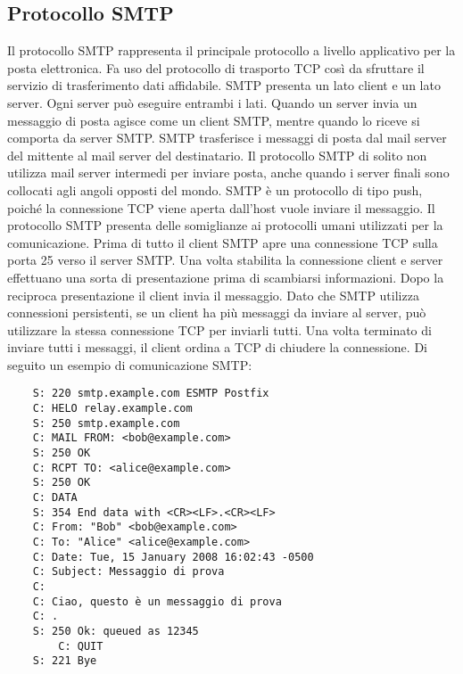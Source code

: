 \subsection{Protocollo SMTP}
Il protocollo SMTP rappresenta il principale protocollo a livello applicativo per la posta elettronica. 
Fa uso del protocollo di trasporto TCP così da sfruttare il servizio di trasferimento dati affidabile. 
SMTP presenta un lato client e un lato server. Ogni server può eseguire entrambi i lati. 
Quando un server invia un messaggio di posta agisce come un client SMTP, mentre quando lo riceve si comporta 
da server SMTP.
SMTP trasferisce i messaggi di posta dal mail server del mittente al mail server del destinatario. 
Il protocollo SMTP di solito non utilizza mail server intermedi per inviare posta, anche quando i server finali 
sono collocati agli angoli opposti del mondo.
SMTP è un protocollo di tipo push, poiché la connessione TCP viene aperta dall’host vuole inviare il messaggio. 
Il protocollo SMTP presenta delle somiglianze ai protocolli umani utilizzati per la comunicazione. 
Prima di tutto il client SMTP apre una connessione TCP sulla porta 25 verso il server SMTP. 
Una volta stabilita la connessione client e server effettuano una sorta di presentazione prima di scambiarsi 
informazioni. Dopo la reciproca presentazione il client invia il messaggio.
Dato che SMTP utilizza connessioni persistenti, se un client ha più messaggi da inviare al server, 
può utilizzare la stessa connessione TCP per inviarli tutti. Una volta terminato di inviare tutti i messaggi, 
il client ordina a TCP di chiudere la connessione.
Di seguito un esempio di comunicazione SMTP:

\begin{verbatim}
    S: 220 smtp.example.com ESMTP Postfix
    C: HELO relay.example.com
    S: 250 smtp.example.com
    C: MAIL FROM: <bob@example.com>
    S: 250 OK
    C: RCPT TO: <alice@example.com>
    S: 250 OK
    C: DATA
    S: 354 End data with <CR><LF>.<CR><LF>
    C: From: "Bob" <bob@example.com>
    C: To: "Alice" <alice@example.com>
    C: Date: Tue, 15 January 2008 16:02:43 -0500
    C: Subject: Messaggio di prova
    C: 
    C: Ciao, questo è un messaggio di prova
    C: .
    S: 250 Ok: queued as 12345
        C: QUIT
    S: 221 Bye
\end{verbatim}

